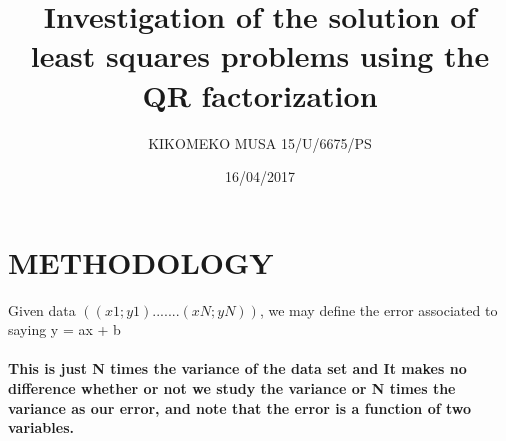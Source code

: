 \documentclass[12pt, conceptpaper]{article}
\begin{document}
    \title{Investigation of the solution of least squares problems using the QR factorization}
    \author{KIKOMEKO MUSA 15/U/6675/PS \\}
    \date{16/04/2017}
    \maketitle
\section{METHODOLOGY}
Given data $((x1; y1).......(xN; yN))$, we may define the error associated to saying y = ax + b
\paragraph{This is just N times the variance of the data set and It makes no difference whether or not we study the variance or N times the variance as our error, and note that the error is a function of two variables.}
\end{document}
